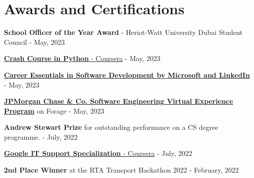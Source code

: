 \documentclass[a4paper,20pt]{article}
\begin{document}
\section{Awards and Certifications}
\begin{description}[font=$\bullet$]
\item {\textbf{School Officer of the Year Award} - Heriot-Watt University Dubai Student Council - May, 2023}
\vspace{-5pt}
\item {\href{https://coursera.org/verify/ABB3UBEAZ79M}{\textbf{Crash Course in Python} - Coursera} - May, 2023}
\vspace{-5pt}
\item {\href{https://www.linkedin.com/learning/certificates/89ecc674e4f0587a88390cc07ce509093d8b63cd8bcb02e3fd833e966bba7ea8}{\textbf{Career Essentials in Software Development by Microsoft and LinkedIn}} - May, 2023}
\vspace{-5pt}
\item {\href{https://forage-uploads-prod.s3.amazonaws.com/completion-certificates/J.P.%20Morgan/R5iK7HMxJGBgaSbvk_J.P.%20Morgan_v7jbBRBbdKKPXyREZ_1683882954578_completion_certificate.pdf}{\textbf{JPMorgan Chase \& Co. Software Engineering Virtual Experience Program}} on Forage - May, 2023}
\vspace{-5pt}
\item {\textbf{Andrew Stewart Prize} for outstanding performance on a CS degree programme. - July, 2022}
\vspace{-5pt}
\item {\href{https://coursera.org/verify/professional-cert/KXSX89ULVN5F}{\textbf{Google IT Support Specialization} - Coursera} - July, 2022}
\vspace{-5pt}
\item {\textbf{2nd Place Winner} at the RTA Transport Hackathon 2022 - February, 2022}

\end{description}

\vspace{-5pt}
\end{document}
